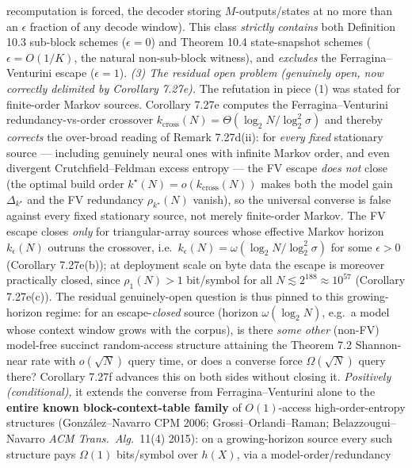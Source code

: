 \documentclass[
]{article}
\begin{document}
\begin{itemize}
  recomputation is forced, the decoder storing $M$-outputs/states at no
  more than an $\epsilon$ fraction of any decode window). This class
  \emph{strictly contains} both Definition 10.3 sub-block schemes
  ($\epsilon = 0$) and Theorem 10.4 state-snapshot schemes ($\epsilon =
  O(1/K)$, the natural non-sub-block witness), and \emph{excludes} the
  Ferragina--Venturini escape ($\epsilon = 1$). \emph{(3) The residual
  open problem (genuinely open, now correctly delimited by Corollary
  7.27e).} The refutation in piece (1) was stated for finite-order Markov
  sources. Corollary 7.27e computes the Ferragina--Venturini
  redundancy-vs-order crossover $k_{\mathrm{cross}}(N) = \Theta(\log_2 N /
  \log_2^2\sigma)$ and thereby \emph{corrects} the over-broad reading of
  Remark 7.27d(ii): for \emph{every fixed} stationary source --- including
  genuinely neural ones with infinite Markov order, and even divergent
  Crutchfield--Feldman excess entropy --- the FV escape \emph{does not}
  close (the optimal build order $k^\star(N) = o(k_{\mathrm{cross}}(N))$
  makes both the model gain $\Delta_{k^\star}$ and the FV redundancy
  $\rho_{k^\star}(N)$ vanish), so the universal converse is false against
  every fixed stationary source, not merely finite-order Markov. The FV
  escape closes \emph{only} for triangular-array sources whose effective
  Markov horizon $k_\epsilon(N)$ outruns the crossover, i.e.\
  $k_\epsilon(N) = \omega(\log_2 N / \log_2^2\sigma)$ for some $\epsilon
  > 0$ (Corollary 7.27e(b)); at deployment scale on byte data the escape
  is moreover practically closed, since $\rho_1(N) > 1$ bit/symbol for all
  $N \lesssim 2^{188} \approx 10^{57}$ (Corollary 7.27e(c)). The residual
  genuinely-open
  question is thus pinned to this growing-horizon regime: for an
  escape-\emph{closed} source (horizon $\omega(\log_2 N)$, e.g.\ a model
  whose context window grows with the corpus), is there \emph{some other}
  (non-FV) model-free succinct random-access structure attaining the
  Theorem 7.2 Shannon-near rate with $o(\sqrt{N})$ query time, or does a
  converse force $\Omega(\sqrt N)$ query there? Corollary 7.27f advances
  this on both sides without closing it. \emph{Positively (conditional),}
  it extends the converse from Ferragina--Venturini alone to the
  \textbf{entire known block-context-table family} of $O(1)$-access
  high-order-entropy structures (Gonz\'alez--Navarro CPM 2006;
  Grossi--Orlandi--Raman; Belazzougui--Navarro \emph{ACM Trans.\ Alg.}\
  11(4) 2015): on a growing-horizon source every such structure pays
  $\Omega(1)$ bits/symbol over $h(X)$, via a model-order/redundancy

\end{itemize}
\end{document}
